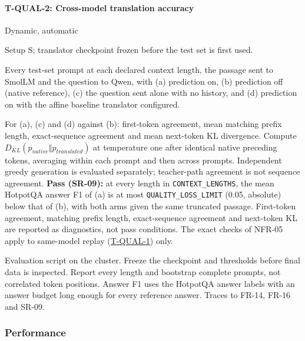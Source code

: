 \documentclass[12pt, titlepage]{article}
\newenvironment{testcase}[2]
  {\Needspace{8\baselineskip}\paragraph{#1: #2}\phantomsection\label{test:#1}\sloppy
   \begin{description}[style=sameline, leftmargin=3.6cm, labelwidth=3.4cm,
     font=\normalfont\bfseries, itemsep=2pt, topsep=2pt]}
  {\end{description}}
\newcommand{\cst}[1]{\texttt{#1}}
\newcommand{\tref}[1]{\hyperref[test:#1]{#1}}
\begin{document}
\begin{testcase}{T-QUAL-2}{Cross-model translation accuracy}
\item[Type] Dynamic, automatic
\item[Initial state] Setup S; translator checkpoint frozen before the test
set is first used.
\item[Input/Condition] Every test-set prompt at each declared context length, the passage
sent to SmolLM and the question to Qwen, with (a) prediction on, (b)
prediction off (native reference), (c) the question sent alone with no
history, and (d) prediction on with the affine baseline translator
configured.
\item[Output/Result] For (a), (c) and (d) against (b): first-token
agreement, mean matching prefix length, exact-sequence agreement and mean
next-token KL divergence. Compute $D_{KL}(p_{native}\Vert p_{translated})$
at temperature one after identical native preceding tokens, averaging
within each prompt and then across prompts. Independent greedy generation
is evaluated separately; teacher-path agreement is not sequence agreement.
\textbf{Pass (SR-09):} at every length in \cst{CONTEXT\_LENGTHS}, the mean
HotpotQA answer F1 of (a) is at most \cst{QUALITY\_LOSS\_LIMIT} (0.05,
absolute) below that of (b), with both arms given the same truncated
passage. First-token agreement, matching prefix length, exact-sequence
agreement and next-token KL are reported as diagnostics, not pass
conditions. The exact checks of NFR-05 apply to same-model replay
(\tref{T-QUAL-1}) only.
\item[How performed] Evaluation script on the cluster. Freeze the
checkpoint and thresholds before final data is inspected. Report every
length and bootstrap complete prompts, not correlated token positions.
Answer F1 uses the HotpotQA answer labels with an answer budget long
enough for every reference answer. Traces to FR-14, FR-16 and SR-09.
\end{testcase}

\subsubsection{Performance}
\end{document}
